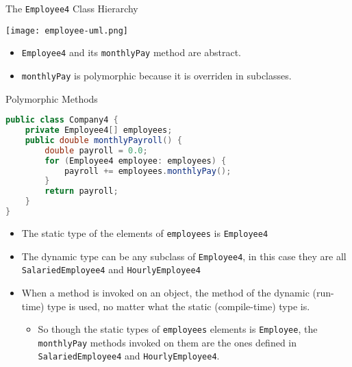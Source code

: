 \documentclass{beamer}
\begin{document}
\begin{frame}[fragile]{The {\tt Employee4} Class Hierarchy}

\begin{center}
\texttt{[image: employee-uml.png]}
\end{center}
\begin{itemize}
\item {\tt Employee4} and its {\tt monthlyPay} method are abstract.
\item {\tt monthlyPay} is polymorphic because it is overriden in subclasses.
\end{itemize}
\end{frame}

\begin{frame}[fragile]{Polymorphic Methods}

\vspace{-.05in}
\begin{lstlisting}[language=Java]
public class Company4 {
    private Employee4[] employees;
    public double monthlyPayroll() {
        double payroll = 0.0;
        for (Employee4 employee: employees) {
            payroll += employees.monthlyPay();
        }
        return payroll;
    }
}
\end{lstlisting}
\vspace{-.1in}
\begin{itemize}
\item The static type of the elements of {\tt employees} is {\tt Employee4}
\item The dynamic type can be any subclass of {\tt Employee4}, in this case they are all {\tt SalariedEmployee4} and {\tt HourlyEmployee4}
\item When a method is invoked on an object, the method of the dynamic (run-time) type is used, no matter what the static (compile-time) type is.
\begin{itemize}
\item So though the static types of {\tt employees} elements is {\tt Employee}, the {\tt monthlyPay} methods invoked on them are the ones defined in {\tt SalariedEmployee4} and {\tt HourlyEmployee4}.
\end{itemize}
\end{itemize}
\end{frame}
\end{document}
